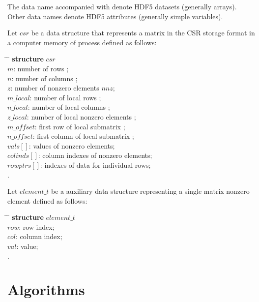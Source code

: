 \documentclass[10pt,a4paper]{article}
\providecommand{\nnz}{\ensuremath{\mathit{nnz}}\xspace}
\providecommand{\var}[1]{\ensuremath{\mathit{#1}}\xspace}
\begin{document}
The data name accompanied with  denote HDF5 datasets (generally arrays). Other data names denote HDF5 attributes (generally simple variables). 

Let \var{csr} be a data structure that represents a matrix in the CSR storage format in a computer memory of process  defined as follows:
\begin{tabbing}
\hspace*{1em} \= \hspace*{6em} \= \kill
\textbf{structure} \var{csr}  \\
\> \var{m}:           \> number of rows ; \\
\> \var{n}:           \> number of columns ; \\
\> \var{z}:           \> number of nonzero elements \nnz; \\
\> \var{m\_local}:    \> number of local rows ; \\
\> \var{n\_local}:    \> number of local columns ; \\
\> \var{z\_local}:    \> number of local nonzero elements ; \\
\> \var{m\_offset}:   \> first row of local submatrix ; \\
\> \var{n\_offset}:   \> first column of local submatrix ; \\
\> \var{vals[]}:      \> values of nonzero elements; \\
\> \var{colinds[]}:   \> column indexes of nonzero elements; \\
\> \var{rowptrs[]}:   \> indexes of data for individual rows; \\
.
\end{tabbing}

Let \var{element\_t} be a auxiliary data structure representing a single matrix nonzero element defined as follows:
\begin{tabbing}
\hspace*{1em} \= \hspace*{4em} \= \kill
\textbf{structure} \var{element\_t}  \\
\> \var{row}:	\> row index; \\
\> \var{col}:	\> column index; \\
\> \var{val}:   \> value; \\
.
\end{tabbing}

\section{Algorithms}
\end{document}
